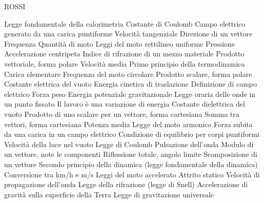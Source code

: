 \documentclass[a4paper,11pt,italian]{article}
\begin{document}
ROSSI
\begin{enumerate}
{Legge fondamentale della calorimetria}
{Costante di Coulomb}
{Campo elettrico generato da una carica puntiforme}
{Velocità tangenziale}
{Direzione di un vettore}
{Frequenza}
{Quantità di moto}
{Leggi del moto rettilineo uniforme}
{Pressione}
{Accelerazione centripeta}
{Indice di rifrazione di un mezzo materiale}
{Prodotto vettoriale, forma polare}
{Velocità media}
{Primo principio della termodinamica}
{Carica elementare}
{Frequenza del moto circolare}
{Prodotto scalare, forma polare}
{Costante elettrica del vuoto}
{Energia cinetica di traslazione}
{Definizione di campo elettrico}
{Forza peso}
{Energia potenziale gravitazionale}
{Legge oraria delle onde in un punto fissato}
{Il lavoro è una variazione di energia}
{Costante dielettrica del vuoto}
{Prodotto di uno scalare per un vettore, forma cartesiana}
{Somma tra vettori, forma cartesiana}
{Potenza media}
{Legge del moto armonico}
{Forza subita da una carica in un campo elettrico}
{Condizione di equilibrio per corpi puntiformi}
{Velocità della luce nel vuoto}
{Legge di Coulomb}
{Pulsazione dell'onda}
{Modulo di un vettore, note le componenti}
{Riflessione totale, angolo limite}
{Scomposizione di un vettore}
{Secondo principio della dinamica (legge fondamentale della dinamica)}
{Conversione tra km/h e m/s}
{Leggi del moto accelerato}
{Attrito statico}
{Velocità di propagazione dell'onda}
{Legge della rifrazione (legge di Snell)}
{Accelerazione di gravità sulla superficie della Terra}
{Legge di gravitazione universale}
\end{enumerate}
\end{document}
